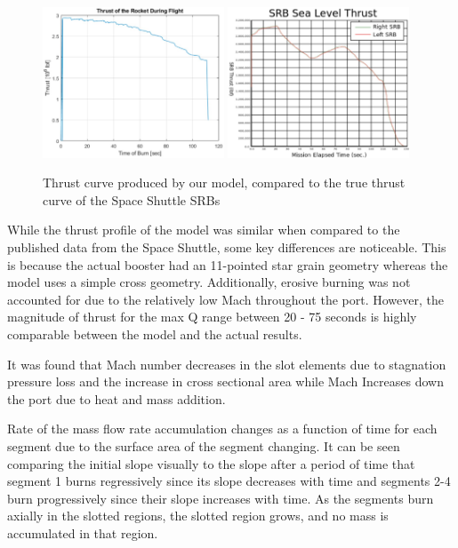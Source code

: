 \begin{figure}
    \centering
    \includegraphics[width=0.48\textwidth]{images/combustion-thrust-v-time}
    \hfill
    \includegraphics[width=0.48\textwidth]{images/srb-thrustcurve}
    \caption{Thrust curve produced by our model, compared to the true thrust curve of the Space Shuttle SRBs}
    \label{figure:thrustcurve-comparison}
\end{figure}

While the thrust profile of the model was similar when compared to the published data from the Space Shuttle, some key differences are noticeable. This is because the actual booster had an 11-pointed star grain geometry whereas the model uses a simple cross geometry. Additionally, erosive burning was not accounted for due to the relatively low Mach throughout the port. However, the magnitude of thrust for the max Q range between 20 - 75 seconds is highly comparable between the model and the actual results.

It was found that Mach number decreases in the slot elements due to stagnation pressure loss and the increase in cross sectional area while Mach Increases down the port due to heat and mass addition.

Rate of the mass flow rate accumulation changes as a function of time for each segment due to the surface area of the segment changing. It can be seen comparing the initial slope visually to the slope after a period of time that segment 1 burns regressively since its slope decreases with time and segments 2-4 burn progressively since their slope increases with time. As the segments burn axially in the slotted regions, the slotted region grows, and no mass is accumulated in that region.


